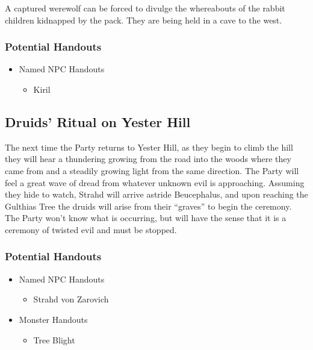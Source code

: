 \documentclass[a4paper,11pt]{article}
\begin{document}
A captured werewolf can be forced to divulge the whereabouts of the rabbit children kidnapped by the pack. They are 
being held in a cave to the west.
\subsubsection{Potential Handouts}
\begin{itemize}
  \item Named NPC Handouts
  \begin{itemize}
    \item Kiril
  \end{itemize}
\end{itemize}

\subsection{Druids' Ritual on Yester Hill}
The next time the Party returns to Yester Hill, as they begin to climb the hill they will hear a thundering 
growing from the road into the woods where they came from and a steadily growing light from the same direction. 
The Party will feel a great wave of dread from whatever unknown evil is approaching. Assuming they hide to watch, 
Strahd will arrive astride Beucephalus, and upon reaching the Gulthias Tree the druids will arise from their 
``graves'' to begin the ceremony. The Party won't know what is occurring, but will have the sense that it is a 
ceremony of twisted evil and must be stopped.
\subsubsection{Potential Handouts}
\begin{itemize}
  \item Named NPC Handouts
  \begin{itemize}
    \item Strahd von Zarovich
  \end{itemize}
  \item Monster Handouts
  \begin{itemize}
    \item Tree Blight
  \end{itemize}
\end{itemize}
\end{document}
